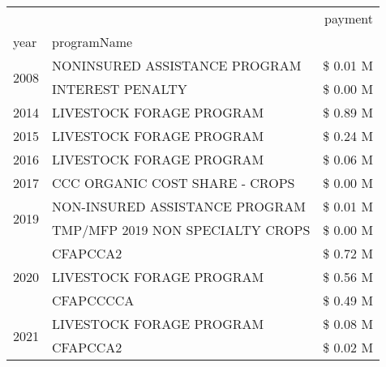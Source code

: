 \begin{tabular}{llr}
\toprule
 &  & payment \\
year & programName &  \\
\midrule
\multirow[t]{2}{*}{2008} & NONINSURED ASSISTANCE PROGRAM & \$ 0.01 M \\
 & INTEREST PENALTY & \$ 0.00 M \\
\cline{1-3}
2014 & LIVESTOCK FORAGE PROGRAM & \$ 0.89 M \\
\cline{1-3}
2015 & LIVESTOCK FORAGE PROGRAM & \$ 0.24 M \\
\cline{1-3}
2016 & LIVESTOCK FORAGE PROGRAM & \$ 0.06 M \\
\cline{1-3}
2017 & CCC ORGANIC COST SHARE - CROPS & \$ 0.00 M \\
\cline{1-3}
\multirow[t]{2}{*}{2019} & NON-INSURED ASSISTANCE PROGRAM & \$ 0.01 M \\
 & TMP/MFP 2019 NON SPECIALTY CROPS & \$ 0.00 M \\
\cline{1-3}
\multirow[t]{3}{*}{2020} & CFAPCCA2 & \$ 0.72 M \\
 & LIVESTOCK FORAGE PROGRAM & \$ 0.56 M \\
 & CFAPCCCCA & \$ 0.49 M \\
\cline{1-3}
\multirow[t]{2}{*}{2021} & LIVESTOCK FORAGE PROGRAM & \$ 0.08 M \\
 & CFAPCCA2 & \$ 0.02 M \\
\cline{1-3}
\bottomrule
\end{tabular}
